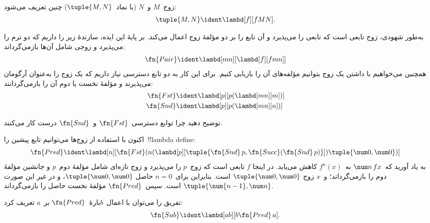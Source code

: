 \documentclass[../../../include/open-logic-section]{subfiles}
\begin{document}

\begin{defn}
زوج~$M$ و~$N$ (با نماد~$\tuple{M,N}$) چنین تعریف می‌شود:
\[
\tuple{M,N} \ident \lambd[f][fMN].
\]
\end{defn}
  
به‌طور شهودی، زوج تابعی است که تابعی را می‌پذیرد و آن تابع را بر دو
مؤلفهٔ زوج اعمال می‌کند. بر پایهٔ این ایده، سازندهٔ زیر را داریم که دو
ترم را می‌پذیرد و زوجی شامل آن‌ها بازمی‌گرداند:
\[
  \fn{Pair} \ident \lambd[mn][\lambd[f][fmn]]
\]
همچنین می‌خواهیم با داشتن یک زوج بتوانیم مؤلفه‌های آن را بازیابی کنیم.
برای این کار به دو تابع دسترسی نیاز داریم که یک زوج را به‌عنوان آرگومان
می‌پذیرند و مؤلفهٔ نخست یا دوم آن را بازمی‌گردانند:
\begin{align*}
  \fn{Fst} & \ident \lambd[p][p(\lambd[mn][m])]\\
  \fn{Snd} & \ident \lambd[p][p(\lambd[mn][n])]
\end{align*}

\begin{prob}
  توضیح دهید چرا توابع دسترسی~$\fn{Fst}$ و~$\fn{Snd}$ درست کار می‌کنند.
\end{prob}

اکنون با استفاده از زوج‌ها می‌توانیم تابع پیشین را~!!{lambda define}:
\[
  \fn{Pred} \ident \lambd[n][\fn{Fst}(n (\lambd[p][\tuple{\fn{Snd}\, {p}, \fn{Succ}(\fn{Snd}\, {p})}]) \tuple{\num 0, \num 0})]
\]
به یاد آورید که~$\num n\, f x$ به~$f^{n}(x)$ کاهش می‌یابد. در اینجا
$f$ تابعی است که زوج~$p$ را می‌پذیرد و زوج تازه‌ای شامل مؤلفهٔ دوم~$p$
و جانشین مؤلفهٔ دوم را بازمی‌گرداند؛ و~$x$ زوج
$\tuple{\num 0,\num 0}$ است. بنابراین برای~$n=0$ حاصل
$\tuple{\num 0,\num 0}$، و در غیر این صورت
$\tuple{\num{n-1}, \num n}$ است. سپس~$\fn{Pred}$ مؤلفهٔ نخست حاصل را
بازمی‌گرداند.

تفریق را می‌توان با اعمال~$b$بارهٔ~$\fn{Pred}$ بر~$a$ تعریف کرد:
\[
\fn{Sub} \ident \lambd[ab][b \fn{Pred}\, a].
\]
    
\end{document}
